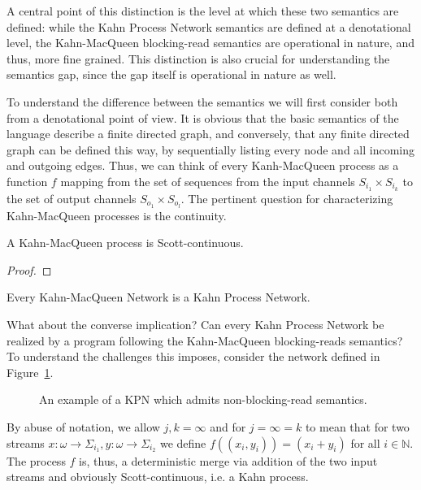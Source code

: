 A central point of this distinction is the level at which these two semantics are defined: while the Kahn Process Network semantics are defined at a denotational level, the Kahn-MacQueen blocking-read semantics are operational in nature, and thus, more fine grained. This distinction is also crucial for understanding the semantics gap, since the gap itself is operational in nature as well. 

To understand the difference between the semantics we will first consider both from a denotational point of view. It is obvious that the basic semantics of the language describe a finite directed graph, and conversely, that any finite directed graph can be defined this way, by sequentially listing every node and all incoming and outgoing edges.
Thus, we can think of every Kanh-MacQueen process as a function $f$ mapping from the set of sequences from the input channels $S_{i_1} \times S_{i_k}$ to the set of output channels $S_{o_1} \times S_{o_l}$.
The pertinent question for characterizing Kahn-MacQueen processes is the continuity. 

\begin{thm}
\label{thm:macqueen}
A Kahn-MacQueen process is Scott-continuous.
\begin{proof}
\end{proof}
\end{thm}

\begin{cor}
\label{cor:macqueen}
Every Kahn-MacQueen Network is a Kahn Process Network.
\end{cor}

What about the converse implication? Can every Kahn Process Network be realized by a program following the Kahn-MacQueen blocking-reads semantics?
To understand the challenges this imposes, consider the network defined in Figure~\ref{fig:macqueen_counterexample}.

\begin{figure}[h]
   \resizebox{0.85\textwidth}{!}{}
	\caption{An example of a \ac{KPN} which admits non-blocking-read semantics.}
	\label{fig:macqueen_counterexample}
\end{figure}

By abuse of notation, we allow $j, k = \infty$ and for $j = \infty = k$ to mean that for two streams $x : \omega \rightarrow \Sigma_{i_1}, y : \omega \rightarrow \Sigma_{i_2}$ we define $f((x_i,y_i)) = (x_i+y_i)$ for all $i \in \mathbb{N}$.
The process $f$ is, thus, a deterministic merge via addition of the two input streams and obviously Scott-continuous, i.e. a Kahn process.

